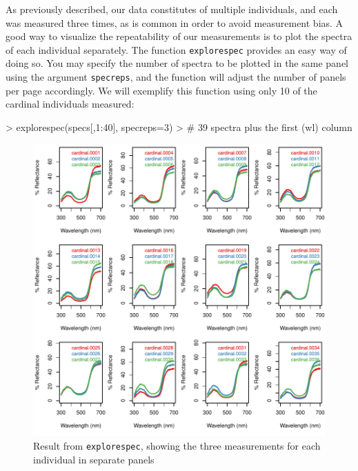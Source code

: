 \documentclass{article}
\newcommand{\code}[1]{{\tt #1}}  %
\begin{document}
As previously described, our data constitutes of multiple individuals, and each was measured 
three times, as is common in order to avoid measurement bias. A good way to visualize the 
repeatability of our measurements is to plot the spectra of each individual separately. The 
function \code{explorespec} provides an easy way of doing so. You may specify the number of 
spectra to be plotted in the same panel using the argument \code{specreps}, and the function 
will adjust the number of panels per page accordingly. We will exemplify this function using 
only 10 of the cardinal individuals measured:

\begin{Schunk}
\begin{Sinput}
> explorespec(specs[,1:40], specreps=3) 
> # 39 spectra plus the first (wl) column
\end{Sinput}
\end{Schunk}

\begin{figure} %
\begin{center}
\includegraphics[width=5in]{pavo-explorespecfig}
\end{center}
\caption{Result from \code{explorespec}, showing the three measurements for each individual in separate panels}
\label{fig1}
\end{figure}
\end{document}
